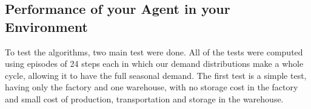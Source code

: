 \documentclass[journal, a4paper]{IEEEtran}
\theoremstyle{plain}
\theoremstyle{definition}
\begin{document}
\subsection{Performance of your Agent in your Environment}
To test the algorithms, two main test were done. All of the tests were computed using episodes of 24 steps each in which our demand distributions make a whole cycle, allowing it to have the full seasonal demand.\newline
The first test is a simple test, having only the factory and one warehouse,  with no storage cost in the factory and small cost of production, transportation and storage in the warehouse. 
\end{document}
